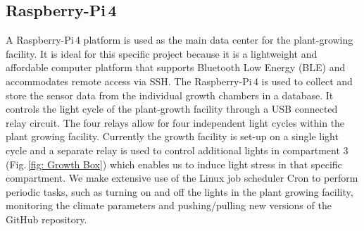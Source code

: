 \documentclass[reprint,superscriptaddress,aps,amsmath,amssymb]{revtex4-1}
\begin{document}
\subsection{Raspberry-Pi\,4}
A Raspberry-Pi\,4 platform is used as the main data center for the plant-growing facility. It is ideal for this specific project because it is a lightweight and affordable computer platform that supports Bluetooth Low Energy (BLE) and accommodates remote access via SSH. The Raspberry-Pi\,4 is used to collect and store the sensor data from the individual growth chambers in a database. It controls the light cycle of the plant-growth facility through a USB connected relay circuit. The four relays allow for four independent light cycles within the plant growing facility. Currently the growth facility is set-up on a single light cycle and a separate relay is used to control additional lights in compartment 3 (Fig.\,\ref{fig: Growth Box}) which enables us to induce light stress in that specific compartment.
We make extensive use of the Linux job scheduler Cron to perform periodic tasks, such as turning on and off the lights in the plant growing facility, monitoring the climate parameters and pushing/pulling new versions of the GitHub repository.
\end{document}
